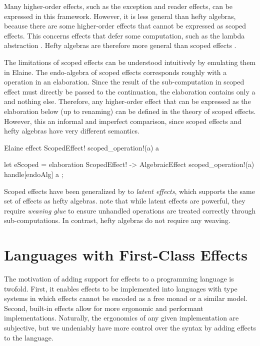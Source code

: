 Many higher-order effects, such as the exception and reader effects, can be expressed in this framework. However, it is less general than hefty algebras, because there are some higher-order effects that cannot be expressed as scoped effects. This concerns effects that defer some computation, such as the lambda abstraction \autocite{oh_latent_2021}. Hefty algebras are therefore more general than scoped effects \autocite{bach_poulsen_hefty_2023}.

The limitations of scoped effects can be understood intuitively by emulating them in Elaine. The endo-algebra of scoped effects corresponds roughly with a  operation in an elaboration. Since the result of the sub-computation in scoped effect must directly be passed to the continuation, the elaboration contains only a  and nothing else. Therefore, any higher-order effect that can be expressed as the elaboration below (up to renaming) can be defined in the theory of scoped effects. However, this an informal and imperfect comparison, since scoped effects and hefty algebras have very different semantics.

\begin{lst}{Elaine}
effect ScopedEffect! {
    scoped_operation!(a) a
}

let eScoped = elaboration ScopedEffect! -> AlgebraicEffect {
    scoped_operation!(a) {
        handle[endoAlg] a
    }
};
\end{lst}
%
Scoped effects have been generalized by \textcite{oh_latent_2021} to \emph{latent effects}, which supports the same set of effects as hefty algebras. \textcite{bach_poulsen_hefty_2023} note that while latent effects are powerful, they require \emph{weaving glue} to ensure unhandled operations are treated correctly through sub-computations. In contrast, hefty algebras do not require any weaving.

\section{Languages with First-Class Effects}

The motivation of adding support for effects to a programming language is twofold. First, it enables effects to be implemented into languages with type systems in which effects cannot be encoded as a free monad or a similar model. Second, built-in effects allow for more ergonomic and performant implementations. Naturally, the ergonomics of any given implementation are subjective, but we undeniably have more control over the syntax by adding effects to the language.

